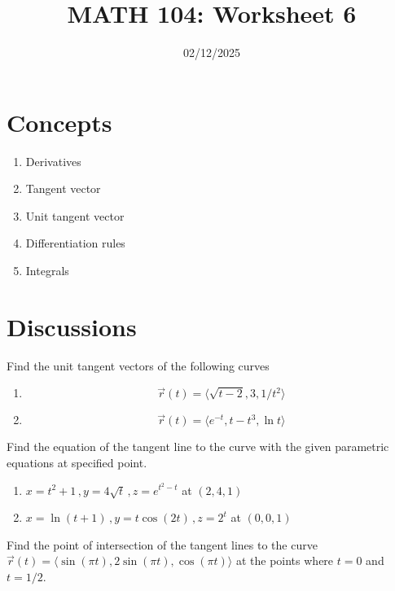 \documentclass[12pt]{amsart}
\title{ MATH 104: Worksheet 6}
\author{}
\date{02/12/2025}
\begin{document}
\maketitle

\section{Concepts}

\begin{enumerate}
	\item Derivatives
	\item Tangent vector
	\item Unit tangent vector
	\item Differentiation rules
	\item Integrals
\end{enumerate}

\section{Discussions}

\begin{question}
	Find the unit tangent vectors of the following curves
	\begin{enumerate}
		\item $$\vec{r}(t) = \langle \sqrt{t - 2} , 3, 1/t^2 \rangle$$
		      \vspace{7cm}
		\item $$ \vec{r}(t) = \langle e^{-t}, t- t^3, \ln t \rangle$$
		      \vspace{7cm}
	\end{enumerate}
\end{question}

\begin{question}
	Find the equation of the tangent line to the curve with the given parametric equations
	at specified point.
	\begin{enumerate}
		\item $ x = t^2 +1\,, y = 4 \sqrt{t} \,, z = e^{t^2 - t}$  at $(2,4,1)$
		      \vspace{7cm}
		\item $ x = \ln (t +1)\,, y = t\cos(2t) \,, z = 2^t$ at $(0,0,1)$
		      \vspace{7cm}
	\end{enumerate}
\end{question}

\begin{question}
	Find the point of intersection of the tangent lines to the curve
	$\vec{r}(t) = \langle \sin (\pi t), 2 \sin (\pi t), \cos(\pi t) \rangle$
	at the points where $t = 0$ and $t = 1/2$.
\end{question}
\vspace{7cm}
\end{document}
